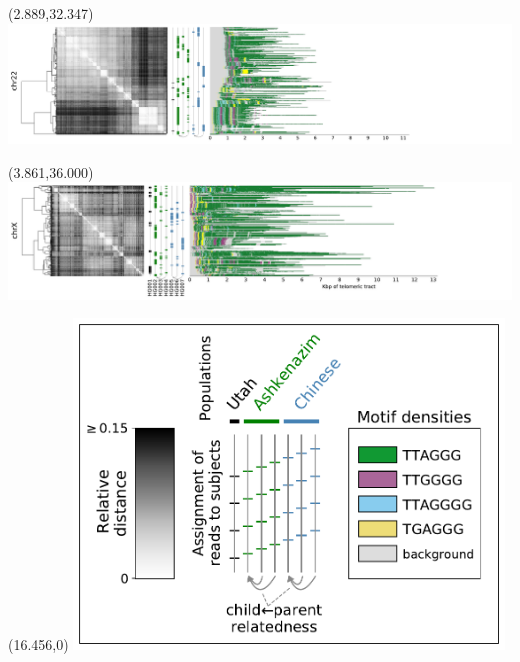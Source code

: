 \documentclass{article}
\begin{document}
\begin{textblock}{13}(2.889,32.347)\includegraphics{latex/figures/haplotypes/chr22.pdf}\end{textblock}
\begin{textblock}{13}(3.861,36.000)\includegraphics{latex/figures/haplotypes/chrX.pdf}\end{textblock}
\begin{textblock}{13}(16.456,0)
\includegraphics[width=4.500in,keepaspectratio]{latex/figures/haplotypes/haplotypes-legend.pdf}
\end{textblock}
\end{document}
